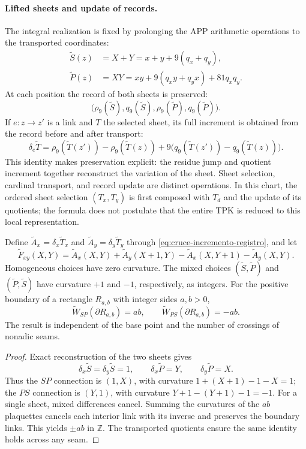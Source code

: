 \paragraph{Lifted sheets and update of records.}
The integral realization is fixed by prolonging the APP arithmetic
operations to the transported coordinates:
\begin{align*}
 \widetilde S(z)&=X+Y=x+y+9(q_x+q_y),\\
 \widetilde P(z)&=XY
 =xy+9(q_xy+q_yx)+81q_xq_y.
\end{align*}
At each position the record of both sheets is preserved:
\[
 \bigl(\rho_9(\widetilde S),q_9(\widetilde S),
       \rho_9(\widetilde P),q_9(\widetilde P)\bigr).
\]
If $e:z\to z'$ is a link and $T$ the selected sheet, its full increment
is obtained from the record before and after transport:
\begin{equation}
 \delta_e\widetilde T=
 \rho_9(\widetilde T(z'))-\rho_9(\widetilde T(z))
 +9\bigl(q_9(\widetilde T(z'))-q_9(\widetilde T(z))\bigr).
 \label{eq:cruce-incremento-registro}
\end{equation}
This identity makes preservation explicit: the residue jump and
quotient increment together reconstruct the variation of the sheet.
Sheet selection, cardinal transport, and record
update are distinct operations. In this chart, the ordered sheet
selection $(T_x,T_y)$ is first composed with $T_d$ and the update
of its quotients; the formula does not postulate that the entire TPK is reduced
to this local representation.

\begin{proposition}
\label{prop:cruce-stokes-integral}
Define
$\widetilde A_x=\delta_x\widetilde T_x$ and
$\widetilde A_y=\delta_y\widetilde T_y$ through
\eqref{eq:cruce-incremento-registro}, and let
\[
 \widetilde F_{xy}(X,Y)=
 \widetilde A_x(X,Y)+\widetilde A_y(X+1,Y)
 -\widetilde A_x(X,Y+1)-\widetilde A_y(X,Y).
\]
Homogeneous choices have zero curvature. The mixed choices
$(\widetilde S,\widetilde P)$ and
$(\widetilde P,\widetilde S)$ have curvature
$+1$ and $-1$, respectively, as integers. For the positive boundary of a rectangle
$R_{a,b}$ with integer sides $a,b>0$,
\[
 \widetilde W_{SP}(\partial R_{a,b})=ab,\qquad
 \widetilde W_{PS}(\partial R_{a,b})=-ab.
\]
The result is independent of the base point and the number of crossings
of nonadic seams.
\end{proposition}

\begin{proof}
Exact reconstruction of the two sheets gives
\[
 \delta_x\widetilde S=\delta_y\widetilde S=1,
 \qquad\delta_x\widetilde P=Y,
 \qquad\delta_y\widetilde P=X.
\]
Thus the $SP$ connection is $(1,X)$, with curvature
$1+(X+1)-1-X=1$; the $PS$ connection is $(Y,1)$, with curvature
$Y+1-(Y+1)-1=-1$. For a single sheet, mixed
differences cancel. Summing the curvatures of the $ab$ plaquettes cancels each
interior link with its inverse and preserves the boundary links.
This yields $\pm ab$ in $\mathbb Z$. The transported quotients
ensure the same identity holds across any seam.
\end{proof}

